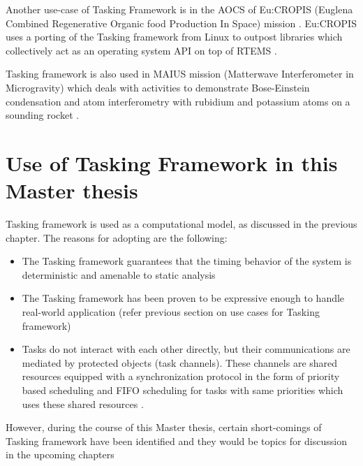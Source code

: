 Another use-case of Tasking Framework is in the AOCS of Eu:CROPIS (Euglena Combined Regenerative Organic food Production In Space) mission \cite{TETtoEUCROPIS}. Eu:CROPIS uses a porting of the Tasking framework from Linux to outpost libraries which collectively act as an operating system API on top of RTEMS \cite{TETtoEUCROPIS}.

Tasking framework is also used in MAIUS mission (Matterwave Interferometer in Microgravity) which deals with activities to demonstrate Bose-Einstein condensation and atom interferometry with rubidium and potassium atoms on a sounding rocket \cite{TETtoEUCROPIS,MAIUS}.

\section{Use of Tasking Framework in this Master thesis}
Tasking framework is used as a computational model, as discussed in the previous chapter. The reasons for adopting are the following:

\begin{itemize}
\item The Tasking framework guarantees that the timing behavior of the system is deterministic and amenable to static analysis
\item The Tasking framework has been proven to be expressive enough to handle real-world application (refer previous section on use cases for Tasking framework)
\item Tasks do not interact with each other directly, but their communications are mediated by protected objects (task channels). These channels are shared resources equipped with a synchronization protocol in the form of priority based scheduling and FIFO scheduling for tasks with same priorities which uses these shared resources \cite{TaskFr}.  
\end{itemize}  

However, during the course of this Master thesis, certain short-comings of Tasking framework have been identified and they would be topics for discussion in the upcoming chapters

             



          